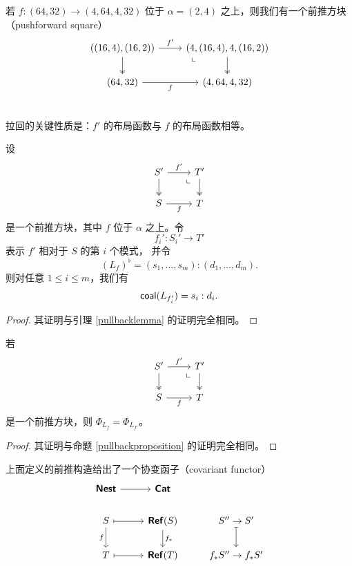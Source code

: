 \begin{example}
    若 $f:(64,32) \to (4,64,4,32)$ 位于 $\alpha = (2,4)$ 之上，则我们有一个前推方块（pushforward square）
    \[ \begin{tikzcd}
    ((16,4),(16,2)) \ar[r,"f'"] \ar[d,two heads] & \arrow[dl, phantom, "\llcorner", very near start](4,(16,4),4,(16,2)) \ar[d, two heads] \\
    (64,32) \ar[r,swap,"f"] & (4,64,4,32)\\
    \end{tikzcd} \]
\end{example}



拉回的关键性质是：$f'$ 的布局函数与 $f$ 的布局函数相等。

\begin{lemma}\label{pushforwardlemma}
    设
    \[ \begin{tikzcd}
    S' \ar[r,"f'"] \ar[d, two heads] & T' \ar[d,two heads]\arrow[dl, phantom, "\llcorner", very near start] \\
    S \ar[r,swap,"f"] & T
    \end{tikzcd} \]
    是一个前推方块，其中 $f$ 位于 $\alpha$ 之上。令
    \[f_i' : S_i' \to T'\]
    表示 $f'$ 相对于 $S$ 的第 $i$ 个模式，
    并令
    \[(L_f)^\flat = (s_1,\dots,s_m):(d_1,\dots,d_m).\]
    则对任意 $1 \leq i \leq m$，我们有
    \[
    \mathsf{coal}(L_{f_i'}) = s_i:d_i.
    \]
\end{lemma}
\begin{proof}
其证明与引理 \ref{pullbacklemma} 的证明完全相同。
\end{proof}


\begin{proposition}\label{pushforwardproposition}
    若
    \[ \begin{tikzcd}
    S' \ar[r,"f'"] \ar[d, two heads]  & T' \ar[d,two heads]\arrow[dl, phantom, "\llcorner", very near start] \\
    S \ar[r,swap,"f"] & T
    \end{tikzcd} \]
    是一个前推方块，则 $\Phi_{L_f} = \Phi_{L_{f'}}$。
\end{proposition}

\begin{proof}
    其证明与命题 \ref{pullbackproposition} 的证明完全相同。
\end{proof}



\begin{observation}
    上面定义的前推构造给出了一个协变函子（covariant functor）
    \[ \begin{tikzcd}
    \catstyle{Nest} \ar[r] & \catstyle{Cat} \\
    S \ar[r,mapsto] \ar[d,swap,"f"] & \catstyle{Ref}(S) \ar[d,"f_*"] & S'' \rightarrow S'\ar[d,mapsto]  \\
    T \ar[r,mapsto]  & \catstyle{Ref}(T)  & f_*S'' \rightarrow f_*S'
    \end{tikzcd} \]
\end{observation}

